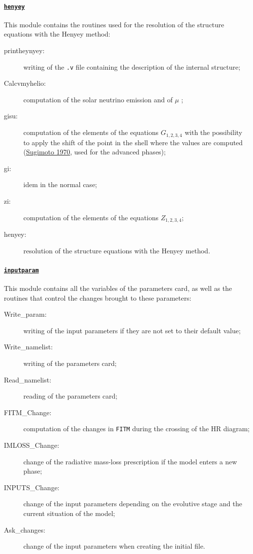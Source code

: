 \documentclass[11pt]{article}
\begin{document}
\paragraph{\underline{\texttt{henyey}}}
This module contains the routines used for the resolution of the structure equations with the Henyey method:

\begin{description}
 \item[printheynyey:] writing of the \texttt{.v} file containing the description of the internal structure;
 \item[Calcvmyhelio:] computation of the solar neutrino emission and of $\mu$ ;
 \item[gisu:] computation of the elements of the equations $G_{1,2,3,4}$ with the possibility to apply the shift of the point in the shell where the values are computed (\href{https://ui.adsabs.harvard.edu/abs/1970ApJ...159..619S}{Sugimoto 1970}, used for the advanced phases);
 \item[gi:] idem in the normal case;
 \item[zi:] computation of the elements of the equations $Z_{1,2,3,4}$;
 \item[henyey:] resolution of the structure equations with the Henyey method.
 \end{description}

\paragraph{\underline{\texttt{inputparam}}}
This module contains all the variables of the parameters card, as well as the routines that control the changes brought to these parameters:

\begin{description}
  \item[Write\_param:] writing of the input parameters if they are not set to their default value;
 \item[Write\_namelist:] writing of the parameters card;
 \item[Read\_namelist:] reading of the parameters card;
\item[FITM\_Change:] computation of the changes in \texttt{FITM} during the crossing of the HR diagram;
 \item[IMLOSS\_Change:] change of the radiative mass-loss prescription if the model enters a new phase;
 \item[INPUTS\_Change:] change of the input parameters depending on the evolutive stage and the current situation of the model;
 \item[Ask\_changes:] change of the input parameters when creating the initial file.
\end{description}
\end{document}
